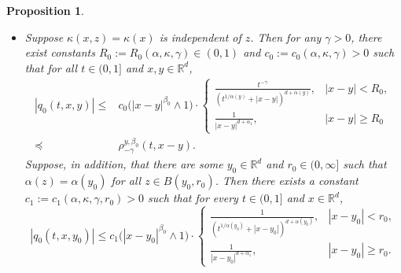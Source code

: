 \documentclass[a4paper,11pt]{amsart}
\renewcommand{\le}{\leqslant}
\renewcommand{\ge}{\geqslant}
\newcommand{\R}{\mathds R}
\newcommand{\p}{\preceq}
\newcommand{\K}{\kappa}
\newcommand{\A}{\alpha}
\newcommand{\G}{\gamma}
\newtheorem{proposition}[theorem]{Proposition}
\theoremstyle{definition}
\begin{document}
\begin{proposition}\label{l2-1}
\begin{itemize}
\item[(1)] Suppose $\K(x,z) =\K (x)$ is independent of $z$. Then for any $\gamma>0$, there exist constants
$R_0:=R_0(\A,\K, \G)\in(0,1)$ and $c_0:=c_0(\A,\K, \G)>0$ such
that for all $t\in(0,1]$ and $x,y\in \R^d$,
\begin{equation}\label{l2-1-2}\begin{split}
|q_0(t,x,y)|\le &c_0\big(|x-y|^{\beta_0}\wedge 1\big)\cdot
\begin{cases}
\frac{t^{-\gamma}}{(t^{{1/\A(y)}}+|x-y|)^{d+\A(y)}},& |x-y|< R_0,\\
\frac{1}{|x-y|^{d+\A_1}},&|x-y|\ge R_0
\end{cases}\\
\p& \rho_{-\gamma}^{y,\beta_0}(t,x-y).\end{split}
\end{equation}
Suppose, in addition, that there are some $y_0\in \R^d$ and $r_0\in(0,\infty]$ such that $\alpha(z)=\alpha(y_0)$ for all $z \in B(y_0,r_0)$. Then
there exists a constant
$c_1:=c_1(\A,\K, \G, r_0)>0$ such that for every $t\in(0,1]$ and $x \in \R^d$,
\begin{equation}\label{l2-1-33a}
|q_0(t,x,y_0)|\le c_1\big(|x-y_0|^{\beta_0}\wedge 1\big)\cdot
\begin{cases}
\frac{1}{(t^{{1/\A(y_0)}}+|x-y_0|)^{d+\A(y_0)}},& |x-y_0|< r_0,\\
\frac{1}{|x-y_0|^{d+\A_1}},&|x-y_0|\ge r_0.
\end{cases}
\end{equation}


\end{itemize}
\end{proposition}
\end{document}
